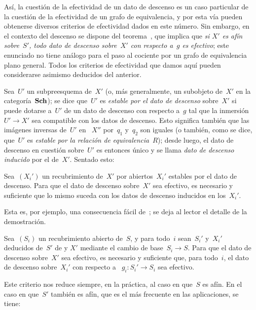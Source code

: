 Así, la cuestión de la efectividad de un dato de descenso es un caso
particular de la cuestión de la efectividad de un grafo de equivalencia, y
por esta vía pueden obtenerse diversos criterios de efectividad dados en
este número. Sin embargo, en el contexto del descenso se dispone del
teorema~, que implica que \emph{si $X'$ es afín sobre~$S'$,
todo dato de descenso sobre~$X'$ con respecto a~$g$ es efectivo}; este
enunciado no tiene análogo para el paso al cociente por un grafo de
equivalencia plano general. Todos los criterios de efectividad que damos
aquí pueden considerarse asimismo deducidos del anterior.

Sea~$U'$ un subpreesquema de~$X'$ (o, más generalmente, un subobjeto de~$X'$
en la categoría~$\mathbf{Sch}$); se dice que~$U'$ es \emph{estable por el dato de
descenso} sobre~$X'$ si puede dotarse a~$U'$ de un dato de descenso con
respecto a~$g$ tal que la inmersión~$U'\to X'$ sea compatible con los datos
de descenso. Esto significa también que las imágenes inversas de~$U'$ en
~$X''$ por~$q_{1}$ y~$q_{2}$ son iguales (o también, como se dice, que~$U'$
es \emph{estable por la relación de equivalencia}~$R$); desde luego, el dato
de descenso en cuestión sobre~$U'$ es entonces único y se llama \emph{dato
de descenso inducido}
%
por el de~$X'$. Sentado esto:

\begin{proposition}
\label{VIII.7.2}
Sea~$(X_{i}')$ un recubrimiento de~$X'$ por abiertos~$X_{i}'$ estables
por el dato de descenso. Para que el dato de descenso sobre~$X'$ sea
efectivo, es necesario y suficiente que lo mismo suceda con los datos de
descenso inducidos en los~$X_{i}'$.
\end{proposition}

Esta es, por ejemplo, una consecuencia fácil de~; se deja al
lector el detalle de la demostración.

\begin{corollaire}
\label{VIII.7.3}
Sea~$(S_{i})$ un recubrimiento abierto de~$S$, y para todo~$i$ sean~$S_{i}'$
y~$X_{i}'$ deducidos de~$S'$
{de}
{y}
$X'$ mediante el cambio de base~$S_{i}\to S$. Para que el dato de descenso
sobre~$X'$ sea efectivo, es necesario y suficiente que, para todo~$i$, el
dato de descenso sobre~$X_{i}'$ con respecto a
~$g_{i}\colon S_{i}'\to S_{i}$ sea efectivo.
\end{corollaire}

Este criterio nos reduce siempre, en la práctica, al caso en que~$S$ es
afín. En el caso en que~$S'$ también es afín, que es el más frecuente en las
aplicaciones, se tiene:

